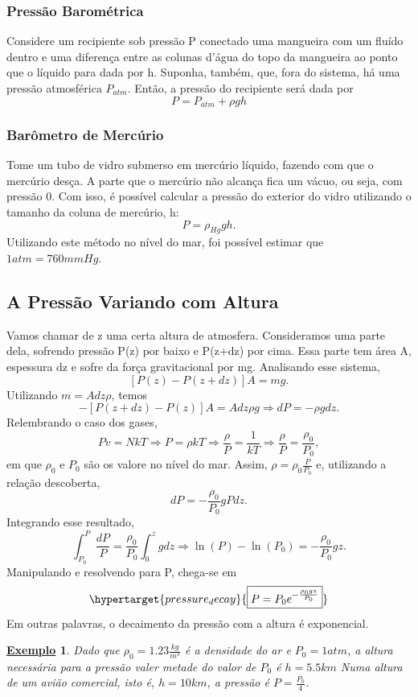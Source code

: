 \documentclass{article}
\newtheorem{example}{\underline{Exemplo}}
\begin{document}
\subsubsection{Pressão Barométrica}
  Considere um recipiente sob pressão P conectado uma mangueira com um fluído dentro e uma diferença entre as colunas d'água
do topo da mangueira ao ponto que o líquido para dada por h. Suponha, também, que, fora do sistema, há uma pressão atmosférica \(P_{atm}\).
Então, a pressão do recipiente será dada por 
  \[
    P = P_{atm} + \rho gh
  \]
\subsubsection{Barômetro de Mercúrio}
  Tome um tubo de vidro submerso em mercúrio líquido, fazendo com que o mercúrio desça. A parte que o mercúrio não alcança fica um vácuo, ou seja, com pressão 0.
Com isso, é possível calcular a pressão do exterior do vidro utilizando o tamanho da coluna de mercúrio, h: 
  \[
    P = \rho_{Hg}gh.
  \]
  Utilizando este método no nível do mar, foi possível estimar que \(1atm = 760mmHg\).

\subsection{A Pressão Variando com Altura}
  Vamos chamar de z uma certa altura de atmosfera. Consideramos uma parte dela, sofrendo pressão P(z) por baixo e P(z+dz) por cima. Essa parte tem área A, espessura dz e sofre
da força gravitacional por mg. Analisando esse sistema, 
  \[
    [P(z) - P(z+dz)]A = mg.
  \]
  Utilizando \(m = Adz\rho \), temos 
    \[
      -[P(z+dz)-P(z)]A = Adz\rho g \Rightarrow dP = -\rho g dz.
    \]
  Relembrando o caso dos gases, 
    \[
      Pv = NkT \Rightarrow P = \rho kT \Rightarrow \frac{\rho }{P} = \frac{1}{kT} \Rightarrow \frac{\rho }{P}=\frac{\rho_{0}}{P_{0}},
    \]
  em que \(\rho_{0}\) e \(P_{0}\) são os valore no nível do mar. Assim, \(\rho = \rho_{0} \frac{P}{P_{0}}\) e, utilizando a relação descoberta, 
    \[
      dP = -\frac{\rho_{0}}{P_{0}}gPdz.
    \]
  Integrando esse resultado, 
    \[
      \int_{P_{0}}^{P}\frac{dP}{P} = \frac{\rho_{0}}{P_{0}}\int_{0}^{z}gdz \Rightarrow \ln{(P)}-\ln{(P_{0})} = -\frac{\rho_{0}}{P_{0}}gz.
    \]
  Manipulando e resolvendo para P, chega-se em 
    \[
      \hypertarget{pressure_decay}{\boxed{P = P_{0}e^{-\frac{\rho_{0}gz}{P_{0}}}}}
    \]
    Em outras palavras, o decaimento da pressão com a altura é exponencial.
\begin{example}
  Dado que \(\rho_{0} = 1.23\frac{kg}{m^{3}}\) é a densidade do ar e \(P_{0} = 1atm\), a altura necessária para a pressão valer metade do valor de \(P_{0}\) é \(h = 5.5km\)
Numa altura de um avião comercial, isto é, \(h=10km\), a pressão é \(P = \frac{P_{0}}{4}\).
\end{example}
\end{document}
